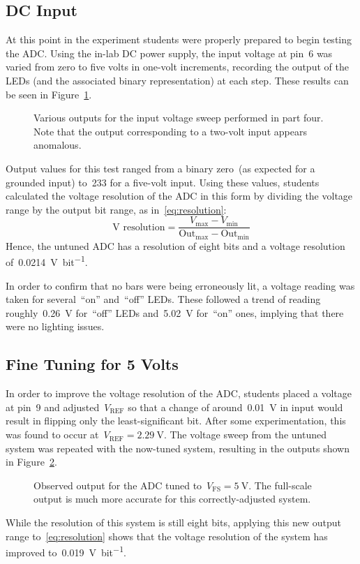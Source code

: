 \subsection{DC Input}
At this point in the experiment students were properly prepared to begin testing the ADC.  Using the in-lab DC power supply, the input voltage at pin~6 was varied from zero to five volts in one-volt increments, recording the output of the LEDs (and the associated binary representation) at each step.  These results can be seen in Figure~\ref{fig:pt4bars}.
%
\begin{figure}[H]
	\centering
	
	\parbox{.6\textwidth}{
	\caption[LED output for untuned ADC]{Various outputs for the input voltage sweep performed in part four.  Note that the output corresponding to a two-volt input appears anomalous.}
	\label{fig:pt4bars}}
\end{figure}
%
Output values for this test ranged from a binary zero~(as expected for a grounded input) to~233 for a five-volt input.  Using these values, students calculated the voltage resolution of the ADC in this form by dividing the voltage range by the output bit range, as in~\eqref{eq:resolution}:
%
\begin{equation}
	\text{V resolution} = \frac{V_\text{max} - V_\text{min}}{\text{Out}_\text{max} - \text{Out}_\text{min}}
	\label{eq:resolution}
\end{equation}
%
Hence, the untuned ADC has a resolution of eight bits and a voltage resolution of~\SI{0.0214}{\volt\per bit}.

In order to confirm that no bars were being erroneously lit, a voltage reading was taken for several~``on'' and~``off'' LEDs.  These followed a trend of reading roughly~\SI{0.26}{\volt} for~``off'' LEDs and~\SI{5.02}{\volt} for~``on'' ones, implying that there were no lighting issues.

\subsection{Fine Tuning for 5 Volts}
In order to improve the voltage resolution of the ADC, students placed a voltage at pin~9 and adjusted~$V_\text{REF}$ so that a change of around~\SI{0.01}{\volt} in input would result in flipping only the least-significant bit.  After some experimentation, this was found to occur at~$V_\text{REF} = \SI{2.29}{\volt}$.  The voltage sweep from the untuned system was repeated with the now-tuned system, resulting in the outputs shown in Figure~\ref{fig:pt5bars}.
%
\begin{figure}[H]
	\centering
	
	\parbox{.6\textwidth}{
	\caption[LED output for tuned ADC; $V_\text{FS} = \SI{5}{\volt}$]{Observed output for the ADC tuned to~$V_\text{FS} = \SI{5}{\volt}$.  The full-scale output is much more accurate for this correctly-adjusted system.}
	\label{fig:pt5bars}}
\end{figure}
%
While the resolution of this system is still eight bits, applying this new output range to~\eqref{eq:resolution} shows that the voltage resolution of the system has improved to~\SI{0.019}{\volt\per bit}.

\begin{figure}[H]
	\centering
	
\end{figure}
